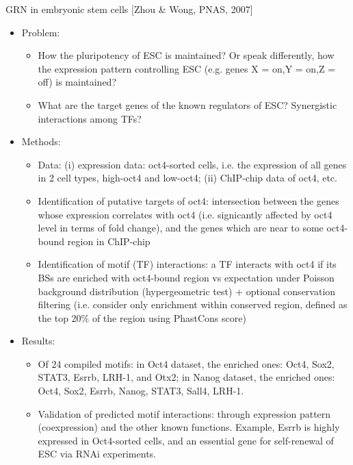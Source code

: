 \documentclass{report}
\begin{document}
GRN in embryonic stem cells [Zhou \& Wong, PNAS, 2007]
\begin{itemize}
	\item Problem:
	\begin{itemize}
		\item How the pluripotency of ESC is maintained? Or speak differently, how the expression pattern controlling ESC (e.g. genes X = on,Y = on,Z = off) is maintained?
		\item What are the target genes of the known regulators of ESC? Synergistic interactions among TFs?
	\end{itemize}
	
	\item Methods:
	\begin{itemize}
		\item Data: (i) expression data: oct4-sorted cells, i.e. the expression of all genes in 2 cell types, high-oct4 and low-oct4; (ii) ChIP-chip data of oct4, etc. 
		
		\item Identification of putative targets of oct4: intersection between the genes whose expression correlates with oct4 (i.e. signicantly affected by oct4 level in terms of fold change), and the genes which are near to some oct4-bound region in ChIP-chip
		
		\item Identification of motif (TF) interactions: a TF interacts with oct4 if its BSs are enriched with oct4-bound region vs expectation under Poisson background distribution (hypergeometric test) + optional conservation filtering (i.e. consider only enrichment within conserved region, defined as the top 20\% of the region using PhastCons score)
	\end{itemize}
	
	\item Results:
	\begin{itemize}
		
		\item Of 24 compiled motifs: in Oct4 dataset, the enriched ones: Oct4, Sox2, STAT3, Esrrb, LRH-1, and Otx2; in Nanog dataset, the enriched ones: Oct4, Sox2, Esrrb, Nanog, STAT3, Sall4, LRH-1. 
		
		\item Validation of predicted motif interactions: through expression pattern (coexpression) and the other known functions. Example, Esrrb is highly expressed in Oct4-sorted cells, and an essential gene for self-renewal of ESC via RNAi experiments. 
		
	\end{itemize}
\end{itemize}	
	
\end{document}
